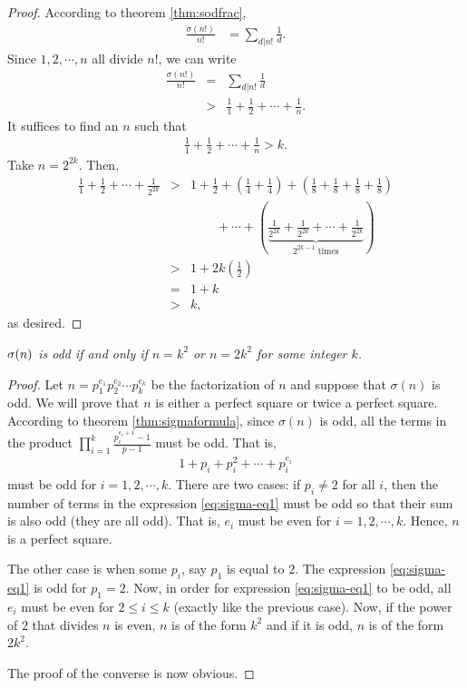 \documentclass[12pt]{subfile}
\begin{document}
	\begin{proof}
		According to theorem \eqref{thm:sodfrac},
			\begin{align*}
				\frac{\sigma(n!)}{n!} &= \sum_{d|n!} \frac{1}{d}.
			\end{align*}
		Since $1,2,\cdots,n$ all divide $n!$, we can write
			\begin{eqnarray*}
				\frac{\sigma(n!)}{n!} &=& \sum_{d|n!} \frac{1}{d}\\
									  &>& \frac{1}{1} + \frac{1}{2}+ \cdots + \frac{1}{n}.
			\end{eqnarray*}
		It suffices to find an $n$ such that
			\begin{align*}
				\frac{1}{1} + \frac{1}{2}+ \cdots + \frac{1}{n} > k.
			\end{align*}
		Take $n=2^{2k}$. Then,
			\begin{eqnarray*}
				\frac{1}{1} + \frac{1}{2}+ \cdots + \frac{1}{2^{2k}} 
					&>& 1 + \frac{1}{2} + \left(\frac{1}{4} + \frac{1}{4}\right) + \left(\frac{1}{8} + \frac{1}{8}+\frac{1}{8} + \frac{1}{8}\right)\\ 
					&\phantom{>}& \qquad  + \cdots + \left(\underbrace{\frac{1}{2^{2k}}+\frac{1}{2^{2k}}+\cdots+\frac{1}{2^{2k}}}_{2^{2k-1} \text{ times}}\right)\\
					&>& 1+2k\left(\frac{1}{2}\right)\\
					&=& 1+k\\
					&>& k,
			\end{eqnarray*}
		as desired.
	\end{proof}

	\begin{theorem}\slshape\label{thm:oddsigma}
		$\sigma (n)$ is odd if and only if $n=k^2$ or $n=2k^2$ for some integer $k$.
	\end{theorem}
	
	\begin{proof}
		Let $n=p_1^{e_1}p_2^{e_2}\cdots p_k^{e_k}$ be the factorization of $n$ and suppose that $\sigma(n)$ is odd. We will prove that $n$ is either a perfect square or twice a perfect square. According to theorem \eqref{thm:sigmaformula}, since $\sigma(n)$ is odd, all the terms in the product $\prod\limits_{i=1}^{k} \frac{p_i^{e_i+1}-1}{p-1}$ must be odd. That is,
		\begin{align}
			1+p_i+p_i^2+\cdots+p_i^{e_i} \label{eq:sigma-eq1}
		\end{align}
		must be odd for $i=1,2,\cdots,k$. There are two cases: if $p_i\neq 2$ for all $i$, then the number of terms in the expression \eqref{eq:sigma-eq1} must be odd so that their sum is also odd (they are all odd). That is, $e_i$ must be even for $i=1,2,\cdots,k$. Hence, $n$ is a perfect square.
		
		The other case is when some $p_i$, say $p_1$ is equal to $2$. The expression \eqref{eq:sigma-eq1} is odd for $p_1=2$. Now, in order for expression \eqref{eq:sigma-eq1} to be odd, all $e_i$ must be even for $2 \leq i \leq k$ (exactly like the previous case). Now, if the power of $2$ that divides $n$ is even, $n$ is of the form $k^2$ and if it is odd, $n$ is of the form $2k^2$.
		
		The proof of the converse is now obvious.
	\end{proof}
	
\end{document}
